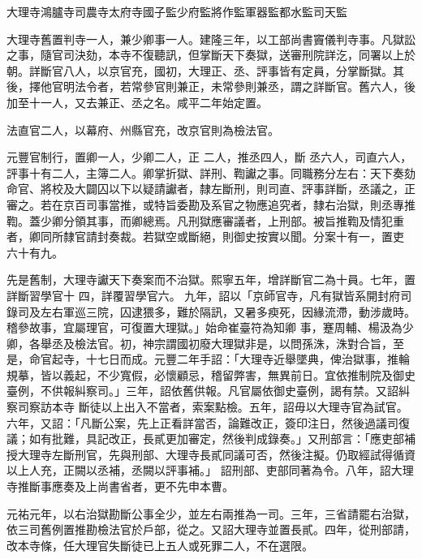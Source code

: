 
\begin{pinyinscope}

 大理寺鴻臚寺司農寺太府寺國子監少府監將作監軍器監都水監司天監



 大理寺舊置判寺一人，兼少卿事一人。建隆三年，以工部尚書竇儀判寺事。凡獄訟之事，隨官司決劾，本寺不復聽訊，但掌斷天下奏獄，送審刑院詳汔，同署以上於朝。詳斷官八人，以京官充，國初，大理正、丞、評事皆有定員，分掌斷獄。其後，擇他官明法令者，若常參官則兼正，未常參則兼丞，謂之詳斷官。舊六人，後加至十一人，又去兼正、丞之名。咸平二年始定置。



 法直官二人，以幕府、州縣官充，改京官則為檢法官。



 元豐官制行，置卿一人，少卿二人，正
 二人，推丞四人，斷
 丞六人，司直六人，評事十有二人，主簿二人。卿掌折獄、詳刑、鞫讞之事。同職務分左右：天下奏劾命官、將校及大闢囚以下以疑請讞者，隸左斷刑，則司直、評事詳斷，丞議之，正審之。若在京百司事當推，或特旨委勘及系官之物應追究者，隸右治獄，則丞專推鞫。蓋少卿分領其事，而卿總焉。凡刑獄應審議者，上刑部。被旨推鞫及情犯重者，卿同所隸官請封奏裁。若獄空或斷絕，則御史按實以聞。分案十有一，置吏
 六十有九。



 先是舊制，大理寺讞天下奏案而不治獄。熙寧五年，增詳斷官二為十員。七年，置詳斷習學官十
 四，詳覆習學官六。
 九年，詔以「京師官寺，凡有獄皆系開封府司錄司及左右軍巡三院，囚逮猥多，難於隔訊，又暑多瘐死，因緣流滯，動涉歲時。稽參故事，宜屬理官，可復置大理獄。」始命崔臺符為知卿
 事，蹇周輔、楊汲為少
 卿，各舉丞及檢法官。初，神宗謂國初廢大理獄非是，以問孫洙，洙對合旨，至是，命官起寺，十七日而成。元豐二年手詔：「大理寺近舉墜典，俾治獄事，推輪規摹，皆以義起，不少寬假，必懷顧忌，稽留弊害，無異前日。宜依推制院及御史臺例，不供報糾察司。」三年，詔依舊供報。凡官屬依御史臺例，謁有禁。又詔糾察司察訪本寺
 斷徒以上出入不當者，索案點檢。五年，詔毋以大理寺官為試官。六年，又詔：「凡斷公案，先上正看詳當否，論難改正，簽印注日，然後過議司復議；如有批難，具記改正，長貳更加審定，然後判成錄奏。」又刑部言：「應吏部補授大理寺左斷刑官，先與刑部、大理寺長貳同議可否，然後注擬。仍取經試得循資以上人充，正闕以丞補，丞闕以評事補。」
 詔刑部、吏部同著為令。八年，詔大理寺推斷事應奏及上尚書省者，更不先申本曹。



 元祐元年，以右治獄勘斷公事全少，並左右兩推為一司。三年，三省請罷右治獄，依三司舊例置推勘檢法官於戶部，從之。又詔大理寺並置長貳。四年，從刑部請，改本寺條，任大理官失斷徒已上五人或死罪二人，不在選限。




\end{pinyinscope}
